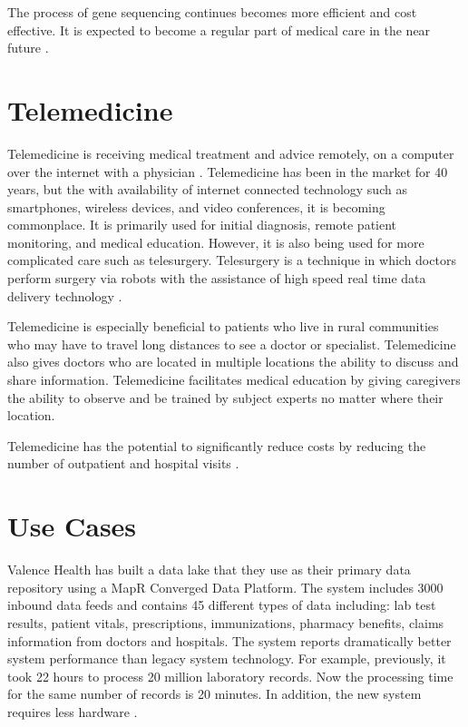\documentclass[sigconf]{acmart}
\begin{document}
The process of gene sequencing continues becomes more efficient and cost effective.  It is expected to become a regular part of medical care in the near future \cite{www-google-HlthCat}.
 

\section{Telemedicine}

Telemedicine is receiving medical treatment and advice remotely, on a computer over the internet with a physician \cite{www-google-forbes042015}.  Telemedicine has been in the market for 40 years, but the with availability of internet connected technology such as smartphones, wireless devices, and video conferences, it is becoming commonplace.  It is primarily used for initial diagnosis, remote patient monitoring, and medical education.  However, it is also being used for more complicated care such as telesurgery. Telesurgery is a technique in which doctors perform surgery via robots with the assistance of high speed real time data delivery technology \cite{www-google-datapine}.

Telemedicine is especially beneficial to patients who live in rural communities who may have to travel long distances to see a doctor or specialist.  Telemedicine also gives doctors who are located in multiple locations the ability to discuss and share information. Telemedicine facilitates medical education by giving caregivers the ability to observe and be trained by subject experts no matter where their location.

Telemedicine has the potential to significantly reduce costs by reducing the number of outpatient and hospital visits \cite{www-google-wikitele}.

 \section{Use Cases}
 
Valence Health has built a data lake that they use as their primary data repository using a MapR Converged Data Platform. The system includes 3000 inbound data feeds and contains 45 different types of data including:  lab test results, patient vitals, prescriptions, immunizations, pharmacy benefits, claims information from doctors and hospitals. The system reports dramatically better system performance than legacy system technology. For example, previously, it took 22 hours to process 20 million laboratory records. Now the processing time for the same number of records is 20 minutes. In addition, the new system requires less hardware \cite{www-google-McDonald}. 
\end{document}

